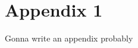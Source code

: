 \documentclass[twocolumn]{aastex62}
\newcommand{\Gus}[1]{\textcolor{red}{#1}}
\newcommand{\kpc}{\text{kpc}}
\newcommand{\kms}{\text{km}/\text{s}}
\begin{document}



\appendix \section{Appendix 1}
Gonna write an appendix probably 


\end{document}
